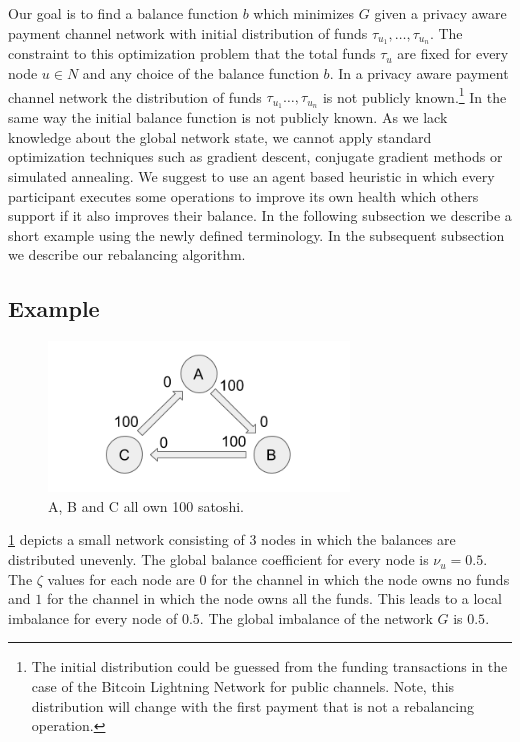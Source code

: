 \documentclass[a4paper]{paper}
\begin{document}
Our goal is to find a balance function $b$ which minimizes $G$ given a privacy aware payment channel network with initial distribution of funds $\tau_{u_1},\dots,\tau_{u_n}$.
The constraint to this optimization problem that the total funds $\tau_u$ are fixed for every node $u \in N$ and any choice of the balance function $b$.
In a privacy aware payment channel network the distribution of funds $\tau_{u_1}\dots,\tau_{u_n}$ is not publicly known.\footnote{The initial distribution could be guessed from the funding transactions in the case of the Bitcoin Lightning Network for public channels. Note, this distribution will change with the first payment that is not a rebalancing operation.}
In the same way the initial balance function is not publicly known.
As we lack knowledge about the global network state, we cannot apply standard optimization techniques such as gradient descent, conjugate gradient methods or simulated annealing.
We suggest to use an agent based heuristic in which every participant executes some operations to improve its own health which others support if it also improves their balance.
In the following subsection we describe a short example using the newly defined terminology. In the subsequent subsection we describe our rebalancing algorithm.


\subsection{Example}
\label{sec:example}

\begin{figure}
 \centering
 \includegraphics[width=8cm]{img/evenUnbalanced.png}
 \caption{A, B and C all own 100 satoshi.}
 \label{fig:evenUnbalanced}
\end{figure}

\cref{fig:evenUnbalanced} depicts a small network consisting of $3$ nodes in which the balances are distributed unevenly.
The global balance coefficient for every node is $\nu_u=0.5$.
The $\zeta$ values for each node are $0$ for the channel in which the node owns no funds and $1$ for the channel in which the node owns all the funds.
This leads to a local imbalance for every node of $0.5$. The global imbalance of the network $G$ is $0.5$.
\end{document}
